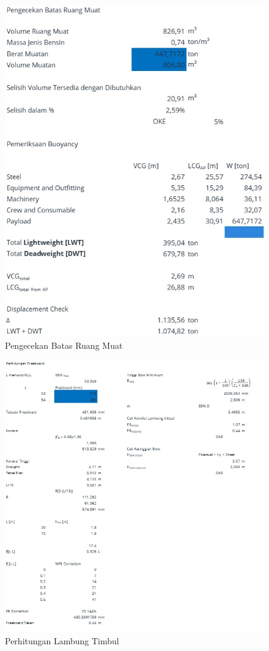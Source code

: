 \begin{figure}[!ht]
    \centering
    \includegraphics[width=\linewidth,keepaspectratio]{lampiran/deskap-10.jpg}
    \caption*{Pengecekan Batas Ruang Muat}
\end{figure}

\begin{figure}[!ht]
    \centering
    \includegraphics[width=\linewidth,keepaspectratio]{lampiran/deskap-11.jpg}
    \caption*{Perhitungan Lambung Timbul}
\end{figure}

